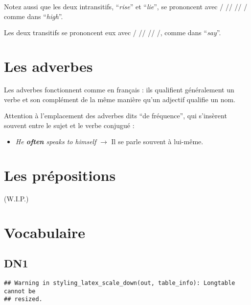 \documentclass[
  10pt,
]{article}
\providecommand{\tightlist}{%
  \setlength{\itemsep}{0pt}\setlength{\parskip}{0pt}}
\begin{document}
Notez aussi que les deux intransitifs, ``\emph{rise}'' et ``\emph{lie}'', se prononcent avec / // // / comme
dans ``\emph{high}''.

Les deux transitifs se prononcent eux avec / // // /, comme dans ``\emph{say}''.

\hypertarget{les-adverbes}{%
\section{Les adverbes}\label{les-adverbes}}

Les adverbes fonctionnent comme en français : ils qualifient généralement un verbe et son complément de la même manière qu'un adjectif qualifie un nom.

Attention à l'emplacement des adverbes dits ``de fréquence'', qui s'insèrent souvent entre le sujet et le verbe conjugué :

\begin{itemize}
\tightlist
\item
  \emph{He \textbf{often} speaks to himself} \(\rightarrow\) Il se parle souvent à lui-même.
\end{itemize}

\hypertarget{les-pruxe9positions}{%
\section{Les prépositions}\label{les-pruxe9positions}}

(W.I.P.)

\hypertarget{vocabulaire}{%
\section{Vocabulaire}\label{vocabulaire}}

\hypertarget{dn1}{%
\subsection{DN1}\label{dn1}}

\begin{verbatim}
## Warning in styling_latex_scale_down(out, table_info): Longtable cannot be
## resized.
\end{verbatim}
\end{document}
